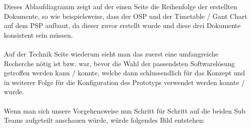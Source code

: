 Dieses Ablaufdiagramm zeigt auf der einen Seite die Reihenfolge der erstellten Dokumente, so wie beispielsweise, dass der OSP und der Timetable / Gant Chart auf dem PSP aufbaut, da dieser zuvor erstellt wurde und diese drei Dokumente konsistent sein müssen.
\paragraph*{}
Auf der Technik Seite wiederum sieht man das zuerst eine umfangreiche Recherche nötig ist bzw. war, bevor die Wahl der passendsten Softwarelösung getroffen werden kann / konnte, welche dann schlussendlich für das Konzept und in weiterer Folge für die Konfiguration des Prototyps verwendet werden konnte / wurde.
\paragraph*{}
Wenn man sich unsere Vorgehensweise nun Schritt für Schritt auf die beiden Sub Teams aufgeteilt anschauen würde, würde folgendes Bild entstehen:

